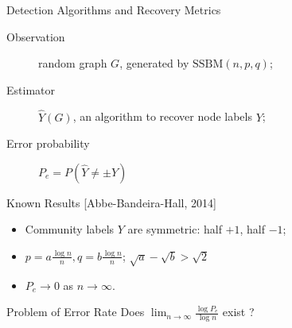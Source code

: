 \documentclass[notheorems]{beamer}
\begin{document}
\begin{frame}{Detection Algorithms and Recovery Metrics}
	\begin{description}
		\item[Observation] random graph $G$, generated by $\textrm{SSBM}(n,p,q)$;
		\item[Estimator] $\hat{Y}(G)$, an algorithm to recover node labels $Y$;
		\item[Error probability] $P_e=P(\hat{Y} \neq \pm Y)$
	\end{description}
	
	\begin{block}{Known Results [Abbe-Bandeira-Hall, 2014]}
		\begin{itemize}
		\item Community labels $Y$ are symmetric: half $+1$, half $-1$;
		\item $p = a\frac{ \log n}{n}, q = b \frac{ \log n}{n}$;
		$\sqrt{a} - \sqrt{b} > \sqrt{2}$
		\item $P_e \to 0$ as $n \to \infty$.
		\end{itemize}
	\end{block}
	\begin{block}{Problem of Error Rate}
	 Does $\lim_{n \to \infty}\frac{\log P_e}{\log n}$
	 exist ?
	\end{block}
\end{frame}
\end{document}
